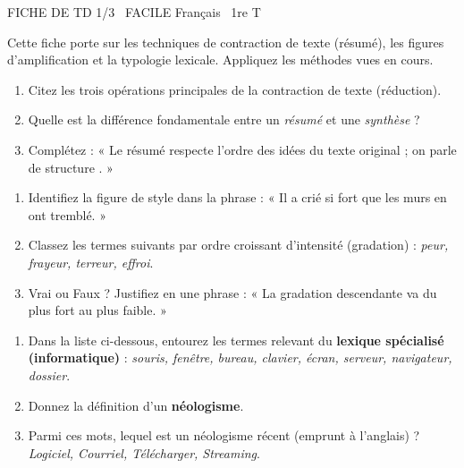 \documentclass[11pt]{article}
\begin{document}
\begin{tcolorbox}[enhanced,colback=popink,colframe=popink,arc=10pt,boxrule=0pt,left=12pt,right=12pt,top=9pt,bottom=9pt]
{\color{white}\popxbold\small FICHE DE TD 1/3 \textbullet\ FACILE \hfill Français \textbullet\ 1re T\par}
\end{tcolorbox}
\vspace{4pt}
Cette fiche porte sur les techniques de contraction de texte (résumé), les figures d'amplification et la typologie lexicale. Appliquez les méthodes vues en cours.

\begin{exercice}
\begin{enumerate}
    \item Citez les trois opérations principales de la contraction de texte (réduction).
    \item Quelle est la différence fondamentale entre un \textit{résumé} et une \textit{synthèse} ?
    \item Complétez : « Le résumé respecte l'ordre des idées du texte original ; on parle de structure \underline{\hspace{4cm}}. »
\end{enumerate}
\end{exercice}

\begin{exercice}
\begin{enumerate}
    \item Identifiez la figure de style dans la phrase : « Il a crié si fort que les murs en ont tremblé. »
    \item Classez les termes suivants par ordre croissant d'intensité (gradation) : \textit{peur, frayeur, terreur, effroi}.
    \item Vrai ou Faux ? Justifiez en une phrase : « La gradation descendante va du plus fort au plus faible. »
\end{enumerate}
\end{exercice}

\begin{exercice}
\begin{enumerate}
    \item Dans la liste ci-dessous, entourez les termes relevant du \textbf{lexique spécialisé (informatique)} : \textit{souris, fenêtre, bureau, clavier, écran, serveur, navigateur, dossier}.
    \item Donnez la définition d'un \textbf{néologisme}.
    \item Parmi ces mots, lequel est un néologisme récent (emprunt à l'anglais) ? \textit{Logiciel, Courriel, Télécharger, Streaming}.
\end{enumerate}
\end{exercice}
\end{document}
